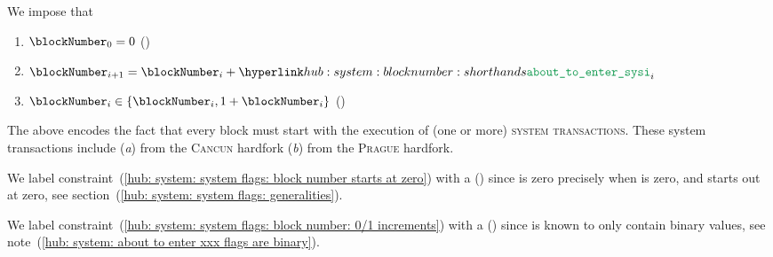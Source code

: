 We impose that
\begin{enumerate}
	\item \label{hub: system: system flags: block number starts at zero} $\blockNumber _{0} = 0$ (\sanityCheck)
	\item $\blockNumber _{i + 1} = \blockNumber _{i} + \aboutToEnterSystemInit _{i}$
	\item \label{hub: system: system flags: block number: 0/1 increments} $\blockNumber _{i} \in \{ \blockNumber _{i}, 1 + \blockNumber _{i} \}$ (\sanityCheck)
\end{enumerate}
\saNote{} \label{hub: system: system flags: block number increments and initial system transactions}
The above encodes the fact that every block must start with the execution of (one or more) \textsc{system transactions}.
These system transactions include
(\emph{a}) \cite{EIP-4788} from the \textsc{Cancun} hardfork
(\emph{b}) \cite{EIP-2935} from the \textsc{Prague} hardfork.

\saNote{}
We label constraint~(\ref {hub: system: system flags: block number starts at zero}) with a (\sanityCheck) since
\blockNumber{} is zero precisely when \flagSum{} is zero, and
\flagSum{} starts out at zero,
see section~(\ref{hub: system: system flags: generalities}).

\saNote{}
We label constraint~(\ref{hub: system: system flags: block number: 0/1 increments}) with a (\sanityCheck) since
\aboutToEnterSystemInit{} is known to only contain binary values,
see note~(\ref{hub: system: about to enter xxx flags are binary}).
